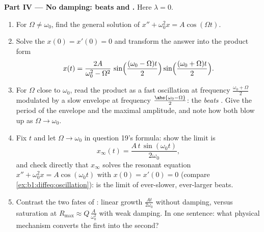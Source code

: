 \begin{problem}
\medskip
\noindent\textbf{Part IV --- No damping: beats and .}
Here $\lambda = 0$.
\begin{enumerate}[resume]
  \item For $\Omega \neq \omega_0$, find the general solution of
        $x'' + \omega_0^2 x = A\cos(\Omega t)$.
  \item Solve the  $x(0) = x'(0) = 0$ and transform
        the answer into the product form
        \[
        x(t) = \frac{2A}{\omega_0^2 - \Omega^2}\,
        \sin\Bigl(\frac{(\omega_0 - \Omega)t}2\Bigr)
        \sin\Bigl(\frac{(\omega_0 + \Omega)t}2\Bigr) .
        \]
  \item For $\Omega$ close to $\omega_0$, read the product as a
        fast oscillation at frequency $\frac{\omega_0 + \Omega}2$
        modulated by a slow envelope at frequency
        $\frac{\abs{\omega_0 - \Omega}}2$: the \emph{beats}
        . Give the period of the envelope and the
        maximal amplitude, and note how both blow up as $\Omega
        \to \omega_0$.
  \item Fix $t$ and let $\Omega \to \omega_0$ in question 19's
        formula: show the limit is
        \[
        x_\infty(t) = \frac{A\,t\,\sin(\omega_0 t)}{2\omega_0} ,
        \]
        and check directly that $x_\infty$ solves the resonant
        equation $x'' + \omega_0^2 x = A\cos(\omega_0 t)$ with
        $x(0) = x'(0) = 0$ (compare
        \cref{ex:b1:diffeq:oscillation}):  is the limit
        of ever-slower, ever-larger beats.
  \item Contrast the two fates of : linear growth
        $\frac{At}{2\omega_0}$ without damping, versus saturation
        at $R_{\max} \approx Q\,\frac{A}{\omega_0^2}$ with weak
        damping. In one sentence: what physical mechanism converts
        the first into the second?
\end{enumerate}


\end{problem}
